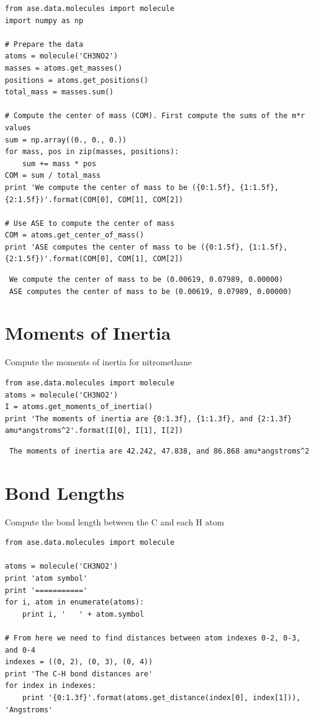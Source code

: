\documentclass[11pt]{article}
\begin{document}
\begin{verbatim}
from ase.data.molecules import molecule
import numpy as np

# Prepare the data
atoms = molecule('CH3NO2')
masses = atoms.get_masses()
positions = atoms.get_positions()
total_mass = masses.sum()

# Compute the center of mass (COM). First compute the sums of the m*r values
sum = np.array((0., 0., 0.))
for mass, pos in zip(masses, positions):
    sum += mass * pos
COM = sum / total_mass
print 'We compute the center of mass to be ({0:1.5f}, {1:1.5f}, {2:1.5f})'.format(COM[0], COM[1], COM[2])

# Use ASE to compute the center of mass
COM = atoms.get_center_of_mass()
print 'ASE computes the center of mass to be ({0:1.5f}, {1:1.5f}, {2:1.5f})'.format(COM[0], COM[1], COM[2])
\end{verbatim}

\begin{verbatim}
 We compute the center of mass to be (0.00619, 0.07989, 0.00000)
 ASE computes the center of mass to be (0.00619, 0.07989, 0.00000)
\end{verbatim}
\section{Moments of Inertia}
\label{sec-3}

Compute the moments of inertia for nitromethane


\begin{verbatim}
from ase.data.molecules import molecule
atoms = molecule('CH3NO2')
I = atoms.get_moments_of_inertia()
print 'The moments of inertia are {0:1.3f}, {1:1.3f}, and {2:1.3f} amu*angstroms^2'.format(I[0], I[1], I[2])
\end{verbatim}

\begin{verbatim}
 The moments of inertia are 42.242, 47.838, and 86.868 amu*angstroms^2
\end{verbatim}
\section{Bond Lengths}
\label{sec-4}

Compute the bond length between the C and each H atom


\begin{verbatim}
from ase.data.molecules import molecule

atoms = molecule('CH3NO2')
print 'atom symbol'
print '==========='
for i, atom in enumerate(atoms):
    print i, '   ' + atom.symbol

# From here we need to find distances between atom indexes 0-2, 0-3, and 0-4
indexes = ((0, 2), (0, 3), (0, 4))
print 'The C-H bond distances are'
for index in indexes:
    print '{0:1.3f}'.format(atoms.get_distance(index[0], index[1])), 'Angstroms'
\end{verbatim}
\end{document}
